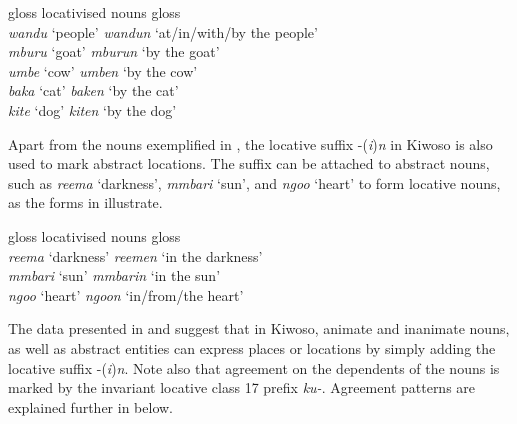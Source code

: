 \documentclass[output=paper]{langscibook}
\begin{document}
\ea%
    \label{ex:mallya:6}
          {gloss}            {locativised nouns}          {gloss}\\
   \textit{wandu}                          \normalfont‘people’        \textit{wandun}                            {\normalfont‘at/in/with/by the people’}\\
  \textit{mburu}                         ‘goat’            \textit{mburun}                            {‘by the goat’}\\
  \textit{umbe}                          ‘cow’            \textit{umben}                              {‘by the cow'}\\
  \textit{baka}                            ‘cat’              \textit{baken}                                {‘by the cat'}\\
  \textit{kite}                             ‘dog’            \textit{kiten}                                  {‘by the dog’}\\
\z

Apart from the nouns exemplified in , the locative suffix -(\textit{i})\textit{n} in Kiwoso is also used to mark abstract locations. The suffix can be attached to abstract nouns, such as \textit{reema} ‘darkness’, \textit{mmbari} ‘sun’, and \textit{ngoo} ‘heart’ to form locative nouns, as the forms in  illustrate.

\ea%
    \label{ex:mallya:7}
         {gloss}                    {locativised nouns}        {gloss}\\
        \textit{reema}                      \normalfont‘darkness’            \textit{reemen}                        {\normalfont‘in the darkness’}\\
    \textit{mmbari}                   ‘sun’                      \textit{mmbarin}                   {‘in the sun’}\\
   \textit{ngoo}                        ‘heart’                    \textit{ngoon}                          {‘in/from/the heart’}\\
   \z

The data presented in  and  suggest that in Kiwoso, animate and inanimate nouns, as well as abstract entities can express places or locations by simply adding the locative suffix -(\textit{i})\textit{n}. Note also that agreement on the dependents of the nouns is marked by the invariant locative class 17 prefix \textit{ku-}. Agreement patterns are explained further in  below.
\end{document}
